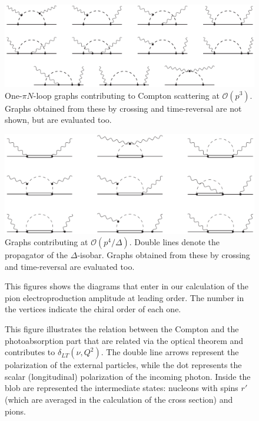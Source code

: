 \documentclass[prc,twocolumn,showpacs,preprintnumbers,amsmath,amssymb
,superscriptaddress,a4paper,nofootinbib
]{revtex4-1}
\begin{document}
 \begin{figure}[bt]
 \centering
 \includegraphics[width=0.95\columnwidth]{Diags1_pv.pdf} 
\caption{%
One-$\pi N$-loop graphs contributing to Compton scattering at $\mathcal{O}(p^3)$. Graphs obtained from these by
crossing and time-reversal are not shown, but are evaluated too.
}
\label{Fig:loops_pv}
\end{figure}

\begin{figure}[t]
\centering
\includegraphics[width=0.95\columnwidth]{DeltaDiags4.pdf} 
\caption{%
Graphs contributing at  $\mathcal{O}(p^4/\mathit{\Delta})$. 
Double lines denote the propagator of the $\Delta$-isobar.
Graphs obtained from these by
crossing and time-reversal are evaluated too.}
\label{Fig:loopsD}
\end{figure}


\begin{figure}
\begin{center}
\caption{This figures shows the diagrams that enter in our calculation of the pion electroproduction amplitude at leading order. The number in the vertices indicate the chiral order of each one.\label{Fig:DiagsOp}}
\end{center}
\end{figure}

\begin{figure}
\begin{center}
\caption{This figure illustrates the relation between the Compton and the photoabsorption part that are related via the optical theorem and contributes to $\delta_{LT}(\nu,Q^2)$. The double line arrows represent the polarization of the external particles, while the dot represents the scalar (longitudinal) polarization of the incoming photon. Inside the blob are represented the intermediate states: nucleons with spins $r'$ (which are averaged in the calculation of the cross section) and pions. \label{Fig:sigmaLT}}
\end{center}
\end{figure}
\end{document}
